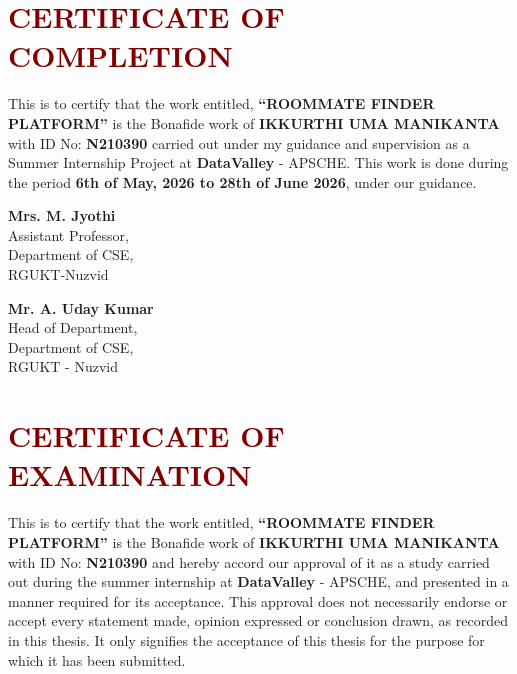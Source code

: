 \documentclass[12pt,a4paper]{report}
\begin{document}
\chapter*{\centering \Large \textcolor{maroon}{CERTIFICATE OF COMPLETION}}
\vspace{1cm}
This is to certify that the work entitled, \textbf{``ROOMMATE FINDER PLATFORM''} is the Bonafide work of \textbf{IKKURTHI UMA MANIKANTA} with ID No: \textbf{N210390} carried out under my guidance and supervision as a Summer Internship Project at \textbf{DataValley} - APSCHE. This work is done during the period \textbf{6th of May, 2026 to 28th of June 2026}, under our guidance.

\vspace{3cm}
\noindent
\begin{minipage}{0.5\textwidth}
\textbf{Mrs. M. Jyothi} \\
Assistant Professor, \\
Department of CSE, \\
RGUKT-Nuzvid
\end{minipage}%
\hfill
\begin{minipage}{0.45\textwidth}
\begin{flushright}
\textbf{Mr. A. Uday Kumar} \\
Head of Department, \\
Department of CSE, \\
RGUKT - Nuzvid
\end{flushright}
\end{minipage}
\newpage

\chapter*{\centering \Large \textcolor{maroon}{CERTIFICATE OF EXAMINATION}}
\vspace{1cm}
This is to certify that the work entitled, \textbf{``ROOMMATE FINDER PLATFORM''} is the Bonafide work of \textbf{IKKURTHI UMA MANIKANTA} with ID No: \textbf{N210390} and hereby accord our approval of it as a study carried out during the summer internship at \textbf{DataValley} - APSCHE, and presented in a manner required for its acceptance. This approval does not necessarily endorse or accept every statement made, opinion expressed or conclusion drawn, as recorded in this thesis. It only signifies the acceptance of this thesis for the purpose for which it has been submitted.
\end{document}
